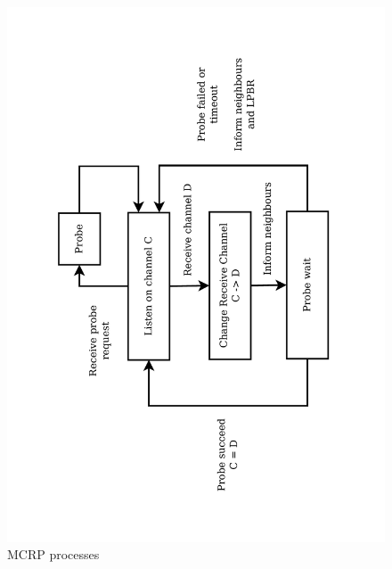 \begin{figure}
\centering
\includegraphics[trim=2cm 2cm 2cm 2cm, clip=true, totalheight=0.36\textheight, angle=270]{figures/channelSwitching.pdf}
\caption{MCRP processes}
\label{fig_mcrpDiagram}
\end{figure}

